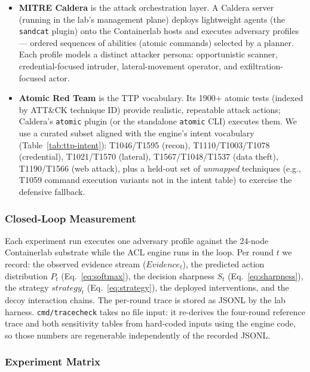 \documentclass[preprints,article,accept,oneauthor]{Definitions/mdpi}
\begin{document}
\begin{itemize}
\item \textbf{MITRE Caldera} \citep{caldera} is the attack orchestration
      layer. A Caldera server (running in the lab's management plane)
      deploys lightweight agents (the \texttt{sandcat} plugin) onto the
      Containerlab hosts and executes adversary profiles --- ordered
      sequences of abilities (atomic commands) selected by a planner. Each
      profile models a distinct attacker persona: opportunistic scanner,
      credential-focused intruder, lateral-movement operator, and
      exfiltration-focused actor.
\item \textbf{Atomic Red Team} \citep{atomic-red-team} is the TTP
      vocabulary. Its 1900+ atomic tests (indexed by ATT\&CK technique ID)
      provide realistic, repeatable attack actions; Caldera's \texttt{atomic}
      plugin (or the standalone \texttt{atomic} CLI) executes them. We use a
      curated subset aligned with the engine's intent vocabulary
      (Table~\ref{tab:ttp-intent}): T1046/T1595 (recon),
      T1110/T1003/T1078 (credential), T1021/T1570 (lateral),
      T1567/T1048/T1537 (data theft), T1190/T1566 (web attack), plus a
      held-out set of \textit{unmapped} techniques (e.g., T1059 command
      execution variants not in the intent table) to exercise the defensive
      fallback.
\end{itemize}

\subsubsection{Closed-Loop Measurement}

Each experiment run executes one adversary profile against the 24-node
Containerlab substrate while the ACL engine runs in the loop. Per round
$t$ we record: the observed evidence stream
($\mathit{Evidence}_t$), the predicted action distribution $P_t$
(Eq.~\ref{eq:softmax}), the decision sharpness $S_t$
(Eq.~\ref{eq:sharpness}), the strategy
$\mathit{strategy}_t$ (Eq.~\ref{eq:strategy}), the deployed interventions,
and the decoy interaction chains. The per-round trace is stored as JSONL by
the lab harness. \texttt{cmd/tracecheck} takes no file input: it re-derives
the four-round reference trace and both sensitivity tables from hard-coded
inputs using the engine code, so those numbers are regenerable independently
of the recorded JSONL.

\subsubsection{Experiment Matrix}
\end{document}
